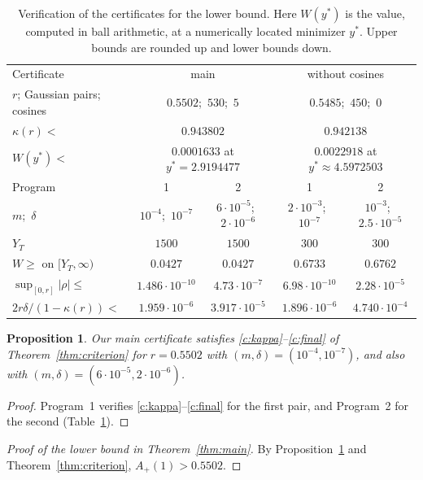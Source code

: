 \documentclass[11pt]{amsart}
\newtheorem{proposition}[theorem]{Proposition}
\theoremstyle{definition}
\theoremstyle{remark}
\numberwithin{equation}{section}
\newcommand{\Ap}{A_+(1)}
\newcommand{\rdec}{0.5502}
\newcommand{\npairsU}{530}
\newcommand{\ncosU}{5}
\newcommand{\kappaU}{0.943802}
\newcommand{\mPoneU}{10^{-4}}
\newcommand{\ePoneU}{10^{-7}}
\newcommand{\YTU}{1500}
\newcommand{\tailPoneU}{0.0427}
\newcommand{\rhoPoneU}{1.486\cdot10^{-10}}
\newcommand{\rhsPoneU}{1.959\cdot10^{-6}}
\newcommand{\mPtwoU}{6\cdot10^{-5}}
\newcommand{\ePtwoU}{2\cdot10^{-6}}
\newcommand{\tailPtwoU}{0.0427}
\newcommand{\rhoPtwoU}{4.73\cdot10^{-7}}
\newcommand{\rhsPtwoU}{3.917\cdot10^{-5}}
\newcommand{\yminU}{2.9194477}
\newcommand{\WminU}{0.0001633}
\newcommand{\rXdec}{0.5485}
\newcommand{\npairsX}{450}
\newcommand{\kappaX}{0.942138}
\newcommand{\YTX}{300}
\newcommand{\mPoneX}{2\cdot10^{-3}}
\newcommand{\ePoneX}{10^{-7}}
\newcommand{\tailPoneX}{0.6733}
\newcommand{\rhoPoneX}{6.98\cdot10^{-10}}
\newcommand{\rhsPoneX}{1.896\cdot10^{-6}}
\newcommand{\mPtwoX}{10^{-3}}
\newcommand{\ePtwoX}{2.5\cdot10^{-5}}
\newcommand{\tailPtwoX}{0.6762}
\newcommand{\rhoPtwoX}{2.28\cdot10^{-5}}
\newcommand{\rhsPtwoX}{4.740\cdot10^{-4}}
\newcommand{\yminX}{4.5972503}
\newcommand{\WminX}{0.0022918}
\begin{document}
\begin{table}[ht]
\centering
\caption{Verification of the certificates for the lower bound. Here $W(y^*)$ is the value, computed in ball arithmetic, at a numerically located minimizer $y^*$. Upper bounds are rounded up and lower bounds down.}\label{tab:verify}
\small
\setlength{\tabcolsep}{3.5pt}
\begin{tabular}{@{}lcccc@{}}
\toprule
Certificate & \multicolumn{2}{c}{main} & \multicolumn{2}{c}{without cosines}\\
$r$; Gaussian pairs; cosines & \multicolumn{2}{c}{$\rdec$;\ $\npairsU$;\ $\ncosU$} & \multicolumn{2}{c}{$\rXdec$;\ $\npairsX$;\ $0$}\\
$\kappa(r)<$ & \multicolumn{2}{c}{$\kappaU$} & \multicolumn{2}{c}{$\kappaX$}\\
$W(y^*)<$ & \multicolumn{2}{c}{$\WminU$ at $y^*=\yminU$} & \multicolumn{2}{c}{$\WminX$ at $y^*\approx\yminX$}\\
\midrule
Program & 1 & 2 & 1 & 2\\
$m$;\ $\delta$ & $\mPoneU$;\ $\ePoneU$ & $\mPtwoU$;\ $\ePtwoU$ & $\mPoneX$;\ $\ePoneX$ & $\mPtwoX$;\ $\ePtwoX$\\
$Y_T$ & $\YTU$ & $\YTU$ & $\YTX$ & $\YTX$\\
$W\ge$ on $[Y_T,\infty)$ & $\tailPoneU$ & $\tailPtwoU$ & $\tailPoneX$ & $\tailPtwoX$\\
$\sup_{[0,r]}|\rho|\le$ & $\rhoPoneU$ & $\rhoPtwoU$ & $\rhoPoneX$ & $\rhoPtwoX$\\
$2r\delta/(1-\kappa(r))<$ & $\rhsPoneU$ & $\rhsPtwoU$ & $\rhsPoneX$ & $\rhsPtwoX$\\
\bottomrule
\end{tabular}
\end{table}

\begin{proposition}\label{prop:cert}
Our main certificate satisfies \ref{c:kappa}--\ref{c:final} of Theorem~\ref{thm:criterion} for $r=\rdec$ with $(m,\delta)=(\mPoneU,\ePoneU)$, and also with $(m,\delta)=(\mPtwoU,\ePtwoU)$.
\end{proposition}

\begin{proof}
Program~1 verifies \ref{c:kappa}--\ref{c:final} for the first pair, and Program~2 for the second (Table~\ref{tab:verify}).
\end{proof}

\begin{proof}[Proof of the lower bound in Theorem~\ref{thm:main}]
By Proposition~\ref{prop:cert} and Theorem~\ref{thm:criterion}, $\Ap>\rdec$.
\end{proof}
\end{document}
